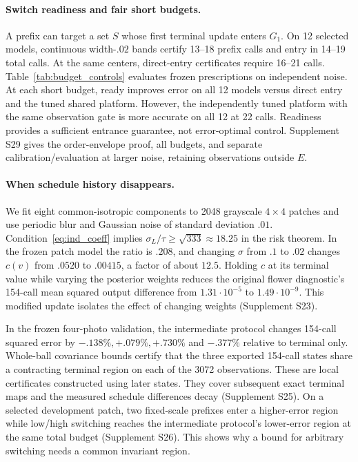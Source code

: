 \paragraph{Switch readiness and fair short budgets.}
A prefix can target a set $S$ whose first terminal update enters
$G_1$. On 12 selected models, continuous width-$.02$ bands certify
13--18 prefix calls and entry in 14--19 total calls. At the same
centers, direct-entry certificates require 16--21 calls.
Table~\ref{tab:budget_controls} evaluates frozen prescriptions
on independent noise. At each short budget, ready improves error
on all 12 models versus direct entry and the tuned shared platform.
However, the independently tuned platform with the same observation
gate is more accurate on all 12 at 22 calls. Readiness provides a
sufficient entrance guarantee, not error-optimal control.
Supplement S29 gives the order-envelope proof, all budgets,
and separate calibration/evaluation at larger noise, retaining
observations outside $E$.

\paragraph{When schedule history disappears.}
We fit eight common-isotropic components to 2048 grayscale
$4\times4$ patches and use periodic blur and Gaussian noise
of standard deviation $.01$. Condition~\eqref{eq:ind_coeff}
implies $\sigma_L/\tau\ge\sqrt{333}\approx18.25$ in the
risk theorem. In the frozen patch model the ratio is $.208$,
and changing $\sigma$ from $.1$ to $.02$ changes $c(v)$ from
$.0520$ to $.00415$, a factor of about $12.5$.
Holding $c$ at its terminal value while varying the posterior
weights reduces the original flower diagnostic's 154-call
mean squared output difference from $1.31\cdot10^{-5}$ to
$1.49\cdot10^{-9}$. This modified update isolates the effect
of changing weights (Supplement S23).

In the frozen four-photo validation, the intermediate protocol
changes 154-call squared error by $-.138\%,+.079\%,+.730\%$
and $-.377\%$ relative to terminal only. Whole-ball covariance
bounds certify that the three exported 154-call states share
a contracting terminal region on each of the 3072 observations.
These are local certificates constructed using later states.
They cover subsequent exact terminal maps and the measured
schedule differences decay (Supplement S25). On a selected
development patch, two fixed-scale prefixes enter a higher-error
region while low/high switching reaches the intermediate
protocol's lower-error region at the same total budget
(Supplement S26). This shows why a bound for arbitrary switching
needs a common invariant region.

